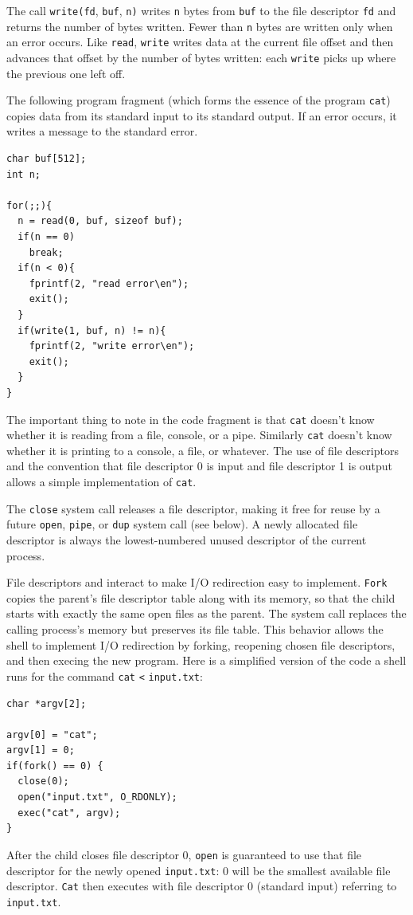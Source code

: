 The call
\lstinline{write(fd},
\lstinline{buf},
\lstinline{n)}
writes
\lstinline{n}
bytes from
\lstinline{buf}
to the file descriptor
\lstinline{fd}
and returns the number of bytes written.
Fewer than
\lstinline{n}
bytes are written only when an error occurs.
Like
\lstinline{read},
\lstinline{write}
writes data at the current file offset and then advances
that offset by the number of bytes written:
each
\lstinline{write}
picks up where the previous one left off.

The following program fragment (which forms the essence of the program
\lstinline{cat})
copies data from its standard input
to its standard output.  If an error occurs, it writes a message
to the standard error.
\begin{lstlisting}[]
char buf[512];
int n;

for(;;){
  n = read(0, buf, sizeof buf);
  if(n == 0)
    break;
  if(n < 0){
    fprintf(2, "read error\en");
    exit();
  }
  if(write(1, buf, n) != n){
    fprintf(2, "write error\en");
    exit();
  }
}
\end{lstlisting}
The important thing to note in the code fragment is that
\lstinline{cat}
doesn't know whether it is reading from a file, console, or a pipe.
Similarly 
\lstinline{cat}
doesn't know whether it is printing to a console, a file, or whatever.
The use of file descriptors and the convention that file descriptor 0
is input and file descriptor 1 is output allows a simple
implementation
of 
\lstinline{cat}.

The
\lstinline{close}
system call
releases a file descriptor, making it free for reuse by a future
\lstinline{open},
\lstinline{pipe},
or
\lstinline{dup}
system call (see below).
A newly allocated file descriptor 
is always the lowest-numbered unused
descriptor of the current process.

File descriptors and
interact to make I/O redirection easy to implement.
\lstinline{Fork}
copies the parent's file descriptor table along with its memory,
so that the child starts with exactly the same open files as the parent.
The system call
replaces the calling process's memory but preserves its file table.
This behavior allows the shell to
implement I/O redirection by forking, reopening chosen file descriptors,
and then execing the new program.
Here is a simplified version of the code a shell runs for the
command
\lstinline{cat}
\lstinline{<}
\lstinline{input.txt}:
\begin{lstlisting}[]
char *argv[2];

argv[0] = "cat";
argv[1] = 0;
if(fork() == 0) {
  close(0);
  open("input.txt", O_RDONLY);
  exec("cat", argv);
}
\end{lstlisting}
After the child closes file descriptor 0,
\lstinline{open}
is guaranteed to use that file descriptor
for the newly opened
\lstinline{input.txt}:
0 will be the smallest available file descriptor.
\lstinline{Cat}
then executes with file descriptor 0 (standard input) referring to
\lstinline{input.txt}.

